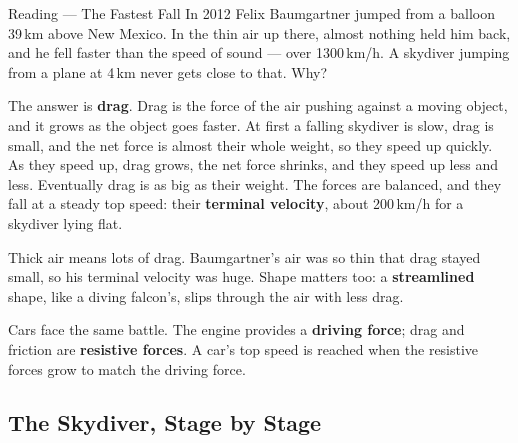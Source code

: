 \begin{readingbox}{Reading --- The Fastest Fall}
In 2012 Felix Baumgartner jumped from a balloon 39\,km above New Mexico. In the thin air up there, almost nothing held him back, and he fell faster than the speed of sound --- over 1300\,km/h. A skydiver jumping from a plane at 4\,km never gets close to that. Why?

The answer is \textbf{drag}. Drag is the force of the air pushing against a moving object, and it grows as the object goes faster. At first a falling skydiver is slow, drag is small, and the net force is almost their whole weight, so they speed up quickly. As they speed up, drag grows, the net force shrinks, and they speed up less and less. Eventually drag is as big as their weight. The forces are balanced, and they fall at a steady top speed: their \textbf{terminal velocity}, about 200\,km/h for a skydiver lying flat.

Thick air means lots of drag. Baumgartner's air was so thin that drag stayed small, so his terminal velocity was huge. Shape matters too: a \textbf{streamlined} shape, like a diving falcon's, slips through the air with less drag.

Cars face the same battle. The engine provides a \textbf{driving force}; drag and friction are \textbf{resistive forces}. A car's top speed is reached when the resistive forces grow to match the driving force.
\end{readingbox}

\rcreset
{}

\label{theory:2}

\subsection{The Skydiver, Stage by Stage}\label{sub:a2.1}


